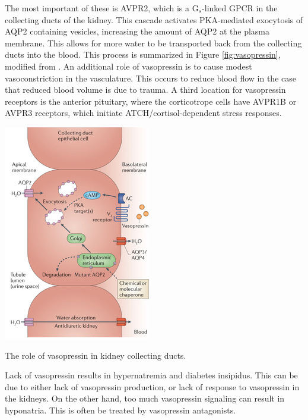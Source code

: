 \documentclass{tufte-handout}
\begin{document}
 The most important of these is AVPR2, which is a G$_s$-linked GPCR in the collecting ducts of the kidney.  This cascade activates PKA-mediated exocytosis of AQP2 containing vesicles, increasing the amount of AQP2 at the plasma membrane.  This allows for more water to be transported back from the collecting ducts into the blood.  This process is summarized in Figure \ref{fig:vasopressin}, modified from \cite{Verkman2014}.  An additional role of vasopressin is to cause modest vasoconstriction in the vasculature.  This occurs to reduce blood flow in the case that reduced blood volume is due to trauma.  A third location for vasopressin receptors is the anterior pituitary, where the corticotrope cells have AVPR1B or AVPR3 receptors, which initiate  ATCH/cortisol-dependent stress responses.

\begin{marginfigure}
  \includegraphics{figures/vasopressin}
  \caption{The role of vasopressin in kidney collecting ducts.}
    \label{fig:vasopressin}
\end{marginfigure}

  Lack of vasopressin results in hypernatremia and diabetes insipidus.  This can be due to either lack of vasopressin production, or lack of response to vasopressin in the kidneys.  On the other hand, too much vasopressin signaling can result in hyponatria.  This is often be treated by vasopressin antagonists.
\end{document}
